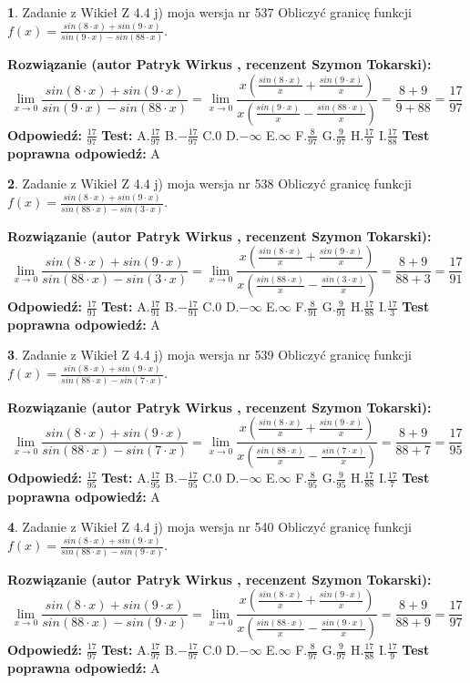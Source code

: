 \documentclass[12pt, a4paper]{article}
\theoremstyle{definition} %
\newtheorem{zad}{}
\newcommand{\zadStart}[1]{\begin{zad}#1\newline}
\newcommand{\zadStop}{\end{zad}}
\newcommand{\rozwStart}[2]{\noindent \textbf{Rozwiązanie (autor #1 , recenzent #2): }\newline}
\newcommand{\rozwStop}{\newline}
\newcommand{\odpStart}{\noindent \textbf{Odpowiedź:}\newline}
\newcommand{\odpStop}{\newline}
\newcommand{\testStart}{\noindent \textbf{Test:}\newline}
\newcommand{\testStop}{\newline}
\newcommand{\kluczStart}{\noindent \textbf{Test poprawna odpowiedź:}\newline}
\newcommand{\kluczStop}{\newline}
\begin{document}
\zadStart{Zadanie z Wikieł Z 4.4 j) moja wersja nr 537}
Obliczyć granicę funkcji $f(x)=\frac{sin(8\cdot x) +sin(9\cdot x)}{sin(9\cdot x) -sin(88\cdot x)}$.
\zadStop
\rozwStart{Patryk Wirkus}{Szymon Tokarski}
$$\lim\limits_{x\to 0}\frac{sin(8\cdot x) +sin(9\cdot x)}{sin(9\cdot x) -sin(88\cdot x)}=\lim\limits_{x\to 0}\frac{x(\frac{sin(8\cdot x)}{x}+\frac{sin(9\cdot x)}{x})}{x(\frac{sin(9\cdot x)}{x}-\frac{sin(88\cdot x)}{x})}=\frac{8+9}{9+88} = \frac{17}{97}$$
\rozwStop
\odpStart
$\frac{17}{97}$
\odpStop
\testStart
A.$\frac{17}{97}$
B.$-\frac{17}{97}$
C.$0$
D.$-\infty$
E.$\infty$
F.$\frac{8}{97}$
G.$\frac{9}{97}$
H.$\frac{17}{9}$
I.$\frac{17}{88}$
\testStop
\kluczStart
A
\kluczStop



\zadStart{Zadanie z Wikieł Z 4.4 j) moja wersja nr 538}
Obliczyć granicę funkcji $f(x)=\frac{sin(8\cdot x) +sin(9\cdot x)}{sin(88\cdot x) -sin(3\cdot x)}$.
\zadStop
\rozwStart{Patryk Wirkus}{Szymon Tokarski}
$$\lim\limits_{x\to 0}\frac{sin(8\cdot x) +sin(9\cdot x)}{sin(88\cdot x) -sin(3\cdot x)}=\lim\limits_{x\to 0}\frac{x(\frac{sin(8\cdot x)}{x}+\frac{sin(9\cdot x)}{x})}{x(\frac{sin(88\cdot x)}{x}-\frac{sin(3\cdot x)}{x})}=\frac{8+9}{88+3} = \frac{17}{91}$$
\rozwStop
\odpStart
$\frac{17}{91}$
\odpStop
\testStart
A.$\frac{17}{91}$
B.$-\frac{17}{91}$
C.$0$
D.$-\infty$
E.$\infty$
F.$\frac{8}{91}$
G.$\frac{9}{91}$
H.$\frac{17}{88}$
I.$\frac{17}{3}$
\testStop
\kluczStart
A
\kluczStop



\zadStart{Zadanie z Wikieł Z 4.4 j) moja wersja nr 539}
Obliczyć granicę funkcji $f(x)=\frac{sin(8\cdot x) +sin(9\cdot x)}{sin(88\cdot x) -sin(7\cdot x)}$.
\zadStop
\rozwStart{Patryk Wirkus}{Szymon Tokarski}
$$\lim\limits_{x\to 0}\frac{sin(8\cdot x) +sin(9\cdot x)}{sin(88\cdot x) -sin(7\cdot x)}=\lim\limits_{x\to 0}\frac{x(\frac{sin(8\cdot x)}{x}+\frac{sin(9\cdot x)}{x})}{x(\frac{sin(88\cdot x)}{x}-\frac{sin(7\cdot x)}{x})}=\frac{8+9}{88+7} = \frac{17}{95}$$
\rozwStop
\odpStart
$\frac{17}{95}$
\odpStop
\testStart
A.$\frac{17}{95}$
B.$-\frac{17}{95}$
C.$0$
D.$-\infty$
E.$\infty$
F.$\frac{8}{95}$
G.$\frac{9}{95}$
H.$\frac{17}{88}$
I.$\frac{17}{7}$
\testStop
\kluczStart
A
\kluczStop



\zadStart{Zadanie z Wikieł Z 4.4 j) moja wersja nr 540}
Obliczyć granicę funkcji $f(x)=\frac{sin(8\cdot x) +sin(9\cdot x)}{sin(88\cdot x) -sin(9\cdot x)}$.
\zadStop
\rozwStart{Patryk Wirkus}{Szymon Tokarski}
$$\lim\limits_{x\to 0}\frac{sin(8\cdot x) +sin(9\cdot x)}{sin(88\cdot x) -sin(9\cdot x)}=\lim\limits_{x\to 0}\frac{x(\frac{sin(8\cdot x)}{x}+\frac{sin(9\cdot x)}{x})}{x(\frac{sin(88\cdot x)}{x}-\frac{sin(9\cdot x)}{x})}=\frac{8+9}{88+9} = \frac{17}{97}$$
\rozwStop
\odpStart
$\frac{17}{97}$
\odpStop
\testStart
A.$\frac{17}{97}$
B.$-\frac{17}{97}$
C.$0$
D.$-\infty$
E.$\infty$
F.$\frac{8}{97}$
G.$\frac{9}{97}$
H.$\frac{17}{88}$
I.$\frac{17}{9}$
\testStop
\kluczStart
A
\kluczStop
\end{document}
